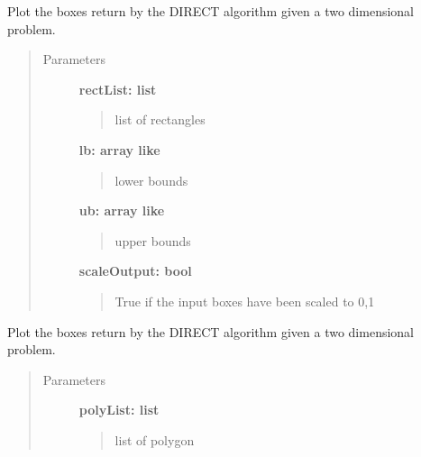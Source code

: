 \documentclass[letterpaper,10pt,english]{sphinxmanual}
\begin{document}
\begin{fulllineitems}
Plot the boxes return by the DIRECT algorithm given a two dimensional problem.
\begin{quote}\begin{description}
\item[{Parameters}] \leavevmode
\textbf{rectList: list}
\begin{quote}

list of rectangles
\end{quote}

\textbf{lb: array like}
\begin{quote}

lower bounds
\end{quote}

\textbf{ub: array like}
\begin{quote}

upper bounds
\end{quote}

\textbf{scaleOutput: bool}
\begin{quote}

True if the input boxes have been scaled to 0,1
\end{quote}

\end{description}\end{quote}

\end{fulllineitems}



\begin{fulllineitems}
Plot the boxes return by the DIRECT algorithm given a two dimensional problem.
\begin{quote}\begin{description}
\item[{Parameters}] \leavevmode
\textbf{polyList: list}
\begin{quote}

list of polygon
\end{quote}

\end{description}\end{quote}

\end{fulllineitems}
\end{document}
